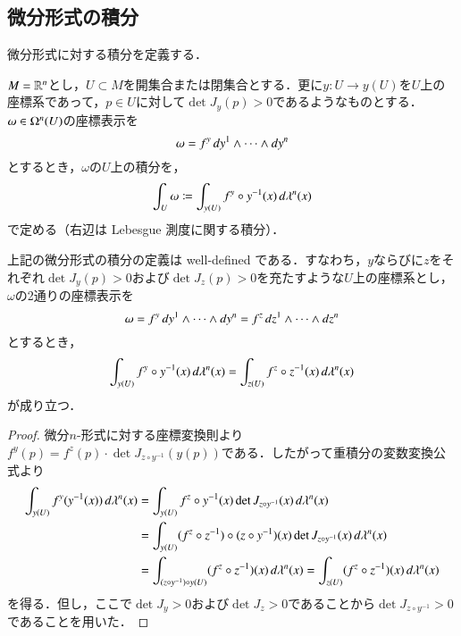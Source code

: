 \subsection{微分形式の積分}

微分形式に対する積分を定義する．

\begin{defi}
$M = \mathbb{R}^n$とし，$U \subset M$を開集合または閉集合とする．更に$y \colon U \to y(U)$を$U$上の座標系であって，$p \in U$に対して$\det J_y(p) > 0$であるようなものとする．$\omega \in \Omega^n(U)$の座標表示を
\begin{equation}
\omega = f^y \mathop{}\!d y^{1} \wedge \dots \wedge \mathop{}\!d y^{n}
\end{equation}とするとき，$\omega$の$U$上の積分を，
\begin{equation}
\int_U \omega \coloneqq \int_{y(U)} f^y \circ y^{-1} (x) \mathop{}\!d \lambda^n(x)
\end{equation}で定める（右辺は Lebesgue 測度に関する積分）．
\end{defi}

\begin{prop}\label{微分形式の積分はwell-defined}
上記の微分形式の積分の定義は well-defined である．すなわち，$y$ならびに$z$をそれぞれ$\det J_y(p)>0$および$\det J_z(p) > 0$を充たすような$U$上の座標系とし，$\omega$の2通りの座標表示を
\begin{equation}
\omega = f^y \mathop{}\!d y^1 \wedge \dots \wedge \mathop{}\!d y^n = f^z \mathop{}\!d z^1 \wedge \dots \wedge \mathop{}\!d z^n
\end{equation}とするとき，
\begin{equation}
\int_{y(U)} f^y \circ y^{-1} (x) \mathop{}\!d \lambda^n(x) = \int_{z(U)} f^z \circ z^{-1} (x) \mathop{}\!d \lambda^n(x)
\end{equation}が成り立つ．
\end{prop}

\begin{proof}
微分$n$-形式に対する座標変換則より$f^y(p) = f^z(p) \cdot \det J_{z \circ y^{-1}}(y(p))$である．したがって重積分の変数変換公式より
\begin{align}
\int_{y(U)} f^y (y^{-1} (x)) \mathop{}\!d \lambda^n (x) &= \int_{y(U)} f^z \circ y^{-1} (x) \det J_{z \circ y^{-1}} (x) \mathop{}\!d \lambda^n (x) \\
&= \int_{y(U)} (f^z \circ z^{-1}) \circ (z \circ y^{-1}) (x) \det J_{z \circ y^{-1}} (x) \mathop{}\!d \lambda^n (x) \\
&= \int_{(z \circ y^{-1}) \circ y(U)} (f^z \circ z^{-1}) (x) \mathop{}\!d \lambda^n (x) = \int_{z(U)} (f^z \circ z^{-1}) (x) \mathop{}\!d \lambda^n (x)
\end{align}を得る．但し，ここで$\det J_y >0$および$\det J_z > 0$であることから$\det J_{z \circ y^{-1}} > 0$であることを用いた．
\end{proof}

